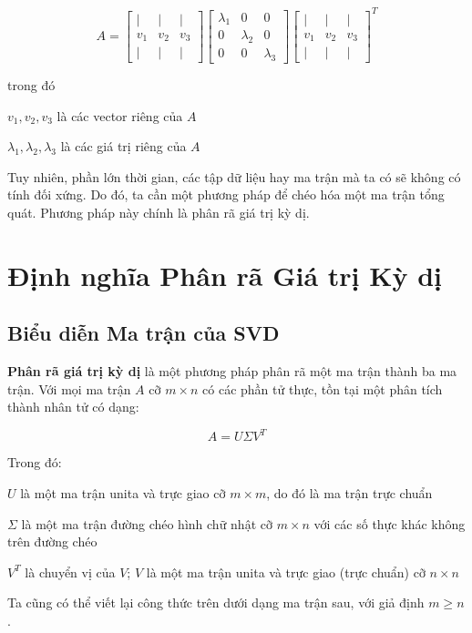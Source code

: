 \[
A=\begin{bmatrix}
| & | &  |\\
v_{1} & v_{2} & v_{3} \\
| & | & |
\end{bmatrix}\begin{bmatrix}
\lambda_{1} & 0 & 0 \\
0 & \lambda_{2} & 0 \\
0 & 0 & \lambda_{3}
\end{bmatrix}\begin{bmatrix}
| & | &  |\\
v_{1} & v_{2} & v_{3} \\
| & | & |
\end{bmatrix}^{T}
\]

trong đó

$v_{1} , v_{2} , v_{3}$ là các vector riêng của $A$

$\lambda_{1} , \lambda_{2} , \lambda_{3}$ là các giá trị riêng của $A$

Tuy nhiên, phần lớn thời gian, các tập dữ liệu hay ma trận mà ta có sẽ không có tính đối xứng. Do đó, ta cần một phương pháp để chéo hóa một ma trận tổng quát. Phương pháp này chính là phân rã giá trị kỳ dị.

\section{Định nghĩa Phân rã Giá trị Kỳ dị}

\subsection{Biểu diễn Ma trận của SVD}

\textbf{Phân rã giá trị kỳ dị} là một phương pháp phân rã một ma trận thành ba ma trận. Với mọi ma trận $A$ cỡ $m\times n$ có các phần tử thực, tồn tại một phân tích thành nhân tử có dạng:

\[
A=U\Sigma V^{T}
\]

Trong đó:

$U$ là một ma trận unita và trực giao cỡ $m\times m$, do đó là ma trận trực chuẩn

$\Sigma$ là một ma trận đường chéo hình chữ nhật cỡ $m\times n$ với các số thực khác không trên đường chéo

$V^{T}$ là chuyển vị của $V$; $V$ là một ma trận unita và trực giao (trực chuẩn) cỡ $n\times n$

Ta cũng có thể viết lại công thức trên dưới dạng ma trận sau, với giả định $m\ge n$.

